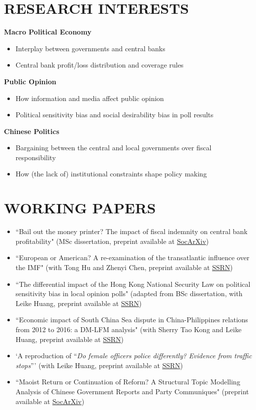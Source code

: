 \documentclass[a4paper,9pt]{extarticle}
\begin{document}
\section*{RESEARCH INTERESTS}
\noindent
\textbf{Macro Political Economy}
\begin{itemize}
    \item Interplay between governments and central banks
    \item Central bank profit/loss distribution and coverage rules
\end{itemize}
\noindent
\textbf
{Public Opinion}
\begin{itemize}
    \item How information and media affect public opinion
    \item Political sensitivity bias and social desirability bias in poll results
\end{itemize}
\noindent
\textbf{Chinese Politics}
\begin{itemize}
    \item Bargaining between the central and local governments over fiscal responsibility
    \item How (the lack of) institutional constraints shape policy making
\end{itemize}
\section*{WORKING PAPERS}
\begin{itemize}
    \item ``Bail out the money printer? The impact of fiscal indemnity on central bank profitability" (MSc dissertation, preprint available at \href{https://doi.org/10.31235/osf.io/wz75m}{SocArXiv})
    \item ``European or American? A re-examination of the transatlantic influence over the IMF" (with Tong Hu and Zhenyi Chen, preprint available at \href{https://dx.doi.org/10.2139/ssrn.5531319}{SSRN})
    \item ``The differential impact of the Hong Kong National Security Law on political sensitivity bias in local opinion polls" (adapted from BSc dissertation, with Leike Huang, preprint available at \href{https://dx.doi.org/10.2139/ssrn.4499460}{SSRN})
    \item ``Economic impact of South China Sea dispute in China-Philippines relations from 2012 to 2016: a DM-LFM analysis" (with Sherry Tao Kong and Leike Huang, preprint available at \href{https://dx.doi.org/10.2139/ssrn.4623476}{SSRN})
    \item `A reproduction of ``\textit{Do female officers police differently? Evidence from traffic stops}”' (with Leike Huang, preprint available at \href{https://dx.doi.org/10.2139/ssrn.4632847}{SSRN})
    \item ``Maoist Return or Continuation of Reform? A Structural Topic Modelling Analysis of Chinese Government Reports and Party Communiques" (preprint available at \href{https://doi.org/10.31235/osf.io/62dvj}{SocArXiv})
\end{itemize}
\end{document}
